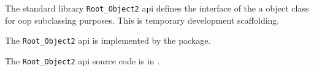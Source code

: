 
The standard library {\tt Root\_Object2} api defines the interface of the a object class for oop subclassing purposes.
This is temporary development scaffolding.

The {\tt Root\_Object2} api is implemented by the  package.

The {\tt Root\_Object2} api source code is in .




